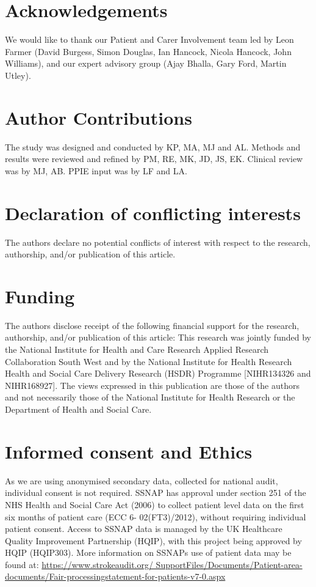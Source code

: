 \section*{Acknowledgements}

We would like to thank our Patient and Carer Involvement team led by Leon Farmer (David Burgess, Simon Douglas, Ian Hancock, Nicola Hancock, John Williams), and our expert advisory group (Ajay Bhalla, Gary Ford, Martin Utley).

\section*{Author Contributions}

The study was designed and conducted by KP, MA, MJ and AL. Methods and results were reviewed and refined by PM, RE, MK, JD, JS, EK. Clinical review was by MJ, AB. PPIE input was by LF and LA.

\section*{Declaration of conflicting interests}

The authors declare no potential conflicts of interest with respect to the research, authorship, and/or publication of this article. 

\section*{Funding}

The authors disclose receipt of the following financial support for the research, authorship, and/or publication of this article: This research was jointly funded by the National Institute for Health and Care Research Applied Research Collaboration South West and by the National Institute for Health Research Health and Social Care Delivery Research (HSDR) Programme [NIHR134326 and NIHR168927]. The views expressed in this publication are those of the authors and not necessarily those of the National Institute for Health Research or the Department of Health and Social Care. 

\section*{Informed consent and Ethics}

As we are using anonymised secondary data, collected for national audit, individual consent is not required. SSNAP has approval under section 251 of the NHS Health and Social Care Act (2006) to collect patient level data on the first six months of patient care (ECC 6- 02(FT3)/2012), without requiring individual patient consent. Access to SSNAP data is managed by the UK Healthcare Quality Improvement Partnership (HQIP), with this project being approved by HQIP (HQIP303). More information on SSNAPs use of patient data may be found at: \url{https://www.strokeaudit.org/ SupportFiles/Documents/Patient-area-documents/Fair-processingstatement-for-patients-v7-0.aspx}

